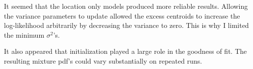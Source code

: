 It seemed that the location only models produced more reliable results. 
Allowing the variance parameters to update allowed the excess centroids to increase the log-likelihood arbitrarily by decreasing the variance to zero.
This is why I limited the minimum $\sigma^2$'s.

It also appeared that initialization played a large role in the goodness of fit. 
The resulting mixture pdf's could vary substantially on repeated runs.
